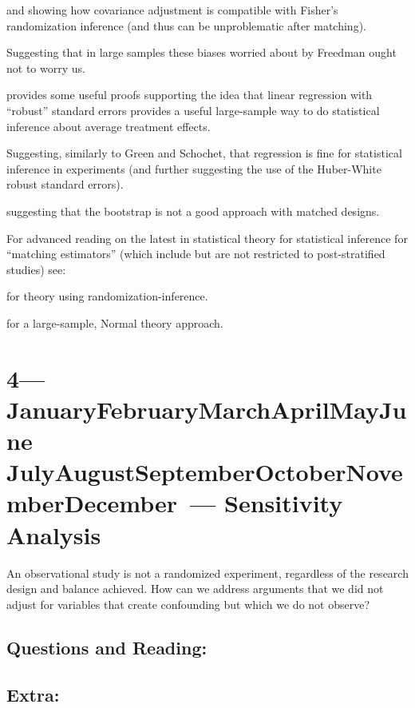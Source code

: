 \documentclass[10pt]{article}
\def\themonth{\ifcase\month\or
  January\or February\or March\or April\or May\or June\or
  July\or August\or September\or October\or November\or December\fi}
\begin{document}
\cite{rosenbaum:2002a} and \cite{bowers2011fish} showing how
covariance adjustment is compatible with Fisher's randomization
inference (and thus can be unproblematic after matching).

\cite{schochet2009regression,green2009ec} Suggesting that in large
samples these biases worried about by Freedman ought not to worry
us. 

\cite{linlr:2011} provides some useful proofs supporting the idea
that linear regression with ``robust'' standard errors provides a
useful large-sample way to do statistical inference about average
treatment effects.

\citealp[Chap 6--8]{imbens2009causal} Suggesting, similarly to Green and
Schochet, that regression is fine for statistical inference in
experiments (and further suggesting the use of the Huber-White robust
standard errors).

\citealp{AbadImbe:2004:On-t} suggesting that the bootstrap is not a good
approach with matched designs.

For advanced reading on the latest in statistical theory for
statistical inference for ``matching estimators'' (which include but
are not restricted to post-stratified studies) see:

\cite{hansen2009prop} for theory using randomization-inference.

\cite{abadie2009matching} for a large-sample, Normal theory approach.


\AdvanceDate[1]
\section{4---\themonth~\the\day--- Sensitivity Analysis }

An observational study is not a randomized experiment, regardless of the
research design and balance achieved. How can we address arguments that we did
not adjust for variables that create confounding but which we do not observe?

\subsection{Questions and Reading:}

\cite{cornfield:1959}

\cite{hosman2010}


\subsection{Extra:}
\end{document}
